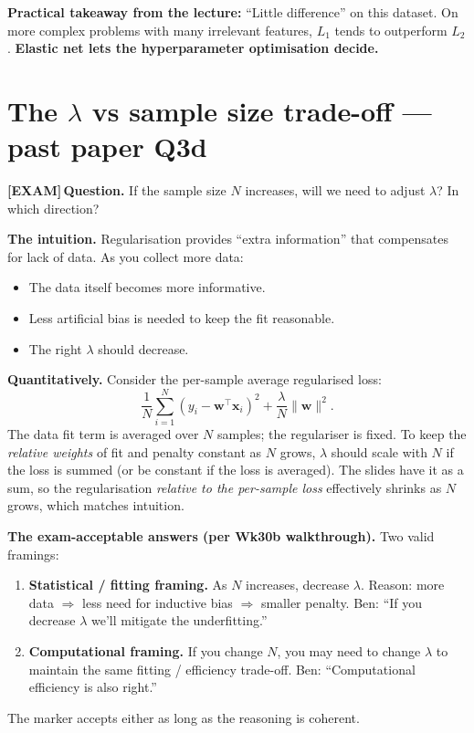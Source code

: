 \documentclass[11pt, a4paper]{article}
\newcommand{\examflag}{\textcolor{tipBd}{\textbf{[EXAM]}}\,}
\begin{document}
\textbf{Practical takeaway from the lecture:} ``Little difference'' on this dataset. On more complex problems with many irrelevant features, $L_1$ tends to outperform $L_2$. \textbf{Elastic net lets the hyperparameter optimisation decide.}

\section{\texorpdfstring{The $\lambda$ vs sample size trade-off --- past paper Q3d}{The lambda vs sample size trade-off --- past paper Q3d}}

\examflag{}\textbf{Question.} If the sample size $N$ increases, will we need to adjust $\lambda$? In which direction?

\textbf{The intuition.} Regularisation provides ``extra information'' that compensates for lack of data. As you collect more data:
\begin{itemize}
  \item The data itself becomes more informative.
  \item Less artificial bias is needed to keep the fit reasonable.
  \item The right $\lambda$ should decrease.
\end{itemize}

\textbf{Quantitatively.} Consider the per-sample average regularised loss:
\[
\frac{1}{N}\sum_{i=1}^N (y_i - \mathbf{w}^\top\mathbf{x}_i)^2 + \frac{\lambda}{N}\|\mathbf{w}\|^2.
\]
The data fit term is averaged over $N$ samples; the regulariser is fixed. To keep the \emph{relative weights} of fit and penalty constant as $N$ grows, $\lambda$ should scale with $N$ if the loss is summed (or be constant if the loss is averaged). The slides have it as a sum, so the regularisation \emph{relative to the per-sample loss} effectively shrinks as $N$ grows, which matches intuition.

\textbf{The exam-acceptable answers (per Wk30b walkthrough).} Two valid framings:
\begin{enumerate}
  \item \textbf{Statistical / fitting framing.} As $N$ increases, decrease $\lambda$. Reason: more data $\Rightarrow$ less need for inductive bias $\Rightarrow$ smaller penalty. Ben: ``If you decrease $\lambda$ we'll mitigate the underfitting.''
  \item \textbf{Computational framing.} If you change $N$, you may need to change $\lambda$ to maintain the same fitting / efficiency trade-off. Ben: ``Computational efficiency is also right.''
\end{enumerate}
The marker accepts either as long as the reasoning is coherent.
\end{document}
